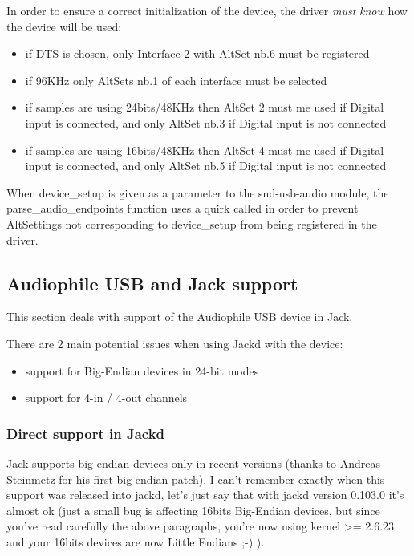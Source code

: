 \documentclass[a4paper,8pt,english]{sphinxmanual}
\begin{document}
In order to ensure a correct initialization of the device, the driver
\emph{must} \emph{know} how the device will be used:
\begin{itemize}
\item {} 
if DTS is chosen, only Interface 2 with AltSet nb.6 must be
registered

\item {} 
if 96KHz only AltSets nb.1 of each interface must be selected

\item {} 
if samples are using 24bits/48KHz then AltSet 2 must me used if
Digital input is connected, and only AltSet nb.3 if Digital input
is not connected

\item {} 
if samples are using 16bits/48KHz then AltSet 4 must me used if
Digital input is connected, and only AltSet nb.5 if Digital input
is not connected

\end{itemize}

When device\_setup is given as a parameter to the snd-usb-audio module, the
parse\_audio\_endpoints function uses a quirk called
 in order to prevent AltSettings not
corresponding to device\_setup from being registered in the driver.


\subsection{Audiophile USB and Jack support}
\label{sound/cards/audiophile-usb:audiophile-usb-and-jack-support}
This section deals with support of the Audiophile USB device in Jack.

There are 2 main potential issues when using Jackd with the device:
\begin{itemize}
\item {} 
support for Big-Endian devices in 24-bit modes

\item {} 
support for 4-in / 4-out channels

\end{itemize}


\subsubsection{Direct support in Jackd}
\label{sound/cards/audiophile-usb:direct-support-in-jackd}
Jack supports big endian devices only in recent versions (thanks to
Andreas Steinmetz for his first big-endian patch). I can't remember
exactly when this support was released into jackd, let's just say that
with jackd version 0.103.0 it's almost ok (just a small bug is affecting
16bits Big-Endian devices, but since you've read carefully the above
paragraphs, you're now using kernel \textgreater{}= 2.6.23 and your 16bits devices
are now Little Endians ;-) ).
\end{document}
